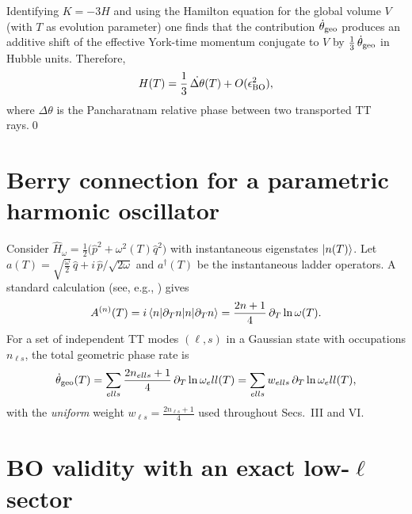 \documentclass[aps,prd,twocolumn,amsmath,amssymb,nofootinbib,superscriptaddress]{revtex4-2}
\def\mathcal#1{#1}%
\begin{document}
Identifying $K=-3H$ and using the Hamilton equation for the global volume $V$ (with $T$ as evolution parameter) one finds that the contribution $\dot{\theta}_{\rm geo}$ produces an additive shift of the effective York-time momentum conjugate to $V$ by $\tfrac13\,\dot{\theta}_{\rm geo}$ in Hubble units. Therefore,
\begin{equation}
H(T)=\frac{1}{3}\,\dot{\Delta\theta}(T)+\mathcal O(\epsilon_{\rm BO}^2),
\end{equation}
where $\Delta\theta$ is the Pancharatnam relative phase between two transported TT rays.\qed

\section{Berry connection for a parametric harmonic oscillator}
\label{app:berry_osc}

Consider $\hat H_\omega=\tfrac{1}{2}\big(\hat p^2+\omega^2(T)\hat q^2\big)$ with instantaneous eigenstates $\ket{n(T)}$.
Let $a(T)=\sqrt{\tfrac{\omega}{2}}\,\hat q + i\,\hat p/\sqrt{2\omega}$ and $a^\dagger(T)$ be the instantaneous ladder operators.
A standard calculation (see, e.g., \cite{Berry1984}) gives
\begin{equation}
\mathcal A^{(n)}(T)=i\braket{n|\partial_T n}
=\frac{2n+1}{4}\,\partial_T\ln\omega(T).
\end{equation}
For a set of independent TT modes $(\ell,s)$ in a Gaussian state with occupations $n_{\ell s}$, the total geometric phase rate is
\begin{equation}
\dot{\theta}_{\rm geo}(T)=\sum_{\ell s}\frac{2n_{\ell s}+1}{4}\,\partial_T\ln\omega_\ell(T)
=\sum_{\ell s} w_{\ell s}\,\partial_T\ln\omega_\ell(T),
\end{equation}
with the \emph{uniform} weight $w_{\ell s}=\tfrac{2n_{\ell s}+1}{4}$ used throughout Secs.~III and VI.

\section{BO validity with an exact low-$\ell$ sector}
\label{app:bo_validity}
\end{document}
